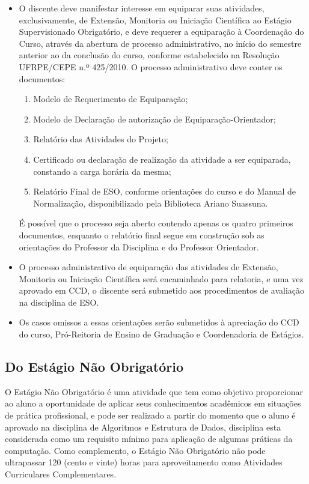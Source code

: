 \documentclass[
	12pt,				%
	openright,			%
  oneside,     %
	a4paper,			%
	english,			%
	french,				%
	spanish,			%
	brazil				%
	]{abntex2}
\begin{document}
\begin{itemize}
    \item O discente deve manifestar interesse em equiparar suas atividades, exclusivamente, de Extensão, Monitoria ou Iniciação Científica ao Estágio Supervisionado Obrigatório, e deve requerer a equiparação à Coordenação do Curso, através da abertura de processo administrativo, no início do semestre anterior ao da conclusão do curso, conforme estabelecido na Resolução UFRPE/CEPE n.º 425/2010. O processo administrativo deve conter os documentos:

    \begin{enumerate}
        \item Modelo de Requerimento de Equiparação;
	\item Modelo de Declaração de autorização de Equiparação-Orientador;
	\item Relatório das Atividades do Projeto;
	\item Certificado ou declaração de realização da atividade a ser equiparada, constando a carga horária da mesma;
	\item Relatório Final de ESO, conforme orientações do curso e do Manual de Normalização, disponibilizado pela Biblioteca Ariano Suassuna.
    \end{enumerate}

    É possível que o processo seja aberto contendo apenas os quatro primeiros documentos, enquanto o relatório final segue em construção sob as orientações do Professor da Disciplina e do Professor Orientador.
    
    \item O processo administrativo de equiparação das atividades de Extensão, Monitoria ou Iniciação Científica será encaminhado para relatoria, e uma vez aprovado em CCD, o discente será submetido aos procedimentos de avaliação na disciplina de ESO.
    \item Os casos omissos a essas orientações serão submetidos à apreciação do CCD do curso, Pró-Reitoria de Ensino de Graduação e Coordenadoria de Estágios.
\end{itemize}

\subsection{Do Estágio Não Obrigatório}

O Estágio Não Obrigatório é uma atividade que tem como objetivo proporcionar ao aluno a oportunidade de aplicar seus conhecimentos acadêmicos em situações de prática profissional, e pode ser realizado a partir do momento que o aluno é aprovado na disciplina de Algoritmos e Estrutura de Dados, disciplina esta considerada como um requisito mínimo para aplicação de algumas práticas da computação. Como complemento, o Estágio Não Obrigatório não pode ultrapassar 120 (cento e vinte) horas para aproveitamento como Atividades Curriculares Complementares.
\end{document}
